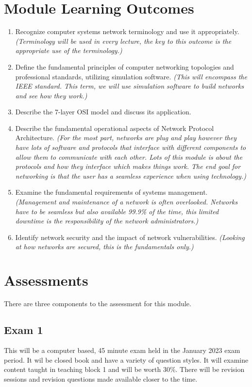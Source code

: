 \section*{Module Learning Outcomes}
\begin{enumerate}
    \item Recognize computer systems network terminology and use it appropriately. \textit{(Terminology will be used in every lecture, the key to this outcome is the appropriate use of the terminology.)}
    \item Define the fundamental principles of computer networking topologies and professional standards, utilizing simulation software. \textit{(This will encompass the IEEE standard. This term, we will use simulation software to build networks and see how they work.)}
    \item Describe the 7-layer OSI model and discuss its application.
    \item Describe the fundamental operational aspects of Network Protocol Architecture. \textit{(For the most part, networks are plug and play however they have lots of software and protocols that interface with different components to allow them to communicate with each other. Lots of this module is about the protocols and how they interface which makes things work. The end goal for networking is that the user has a seamless experience when using technology.)}
    \item Examine the fundamental requirements of systems management. \textit{(Management and maintenance of a network is often overlooked. Networks have to be seamless but also available 99.9\% of the time, this limited downtime is the responsibility of the network administrators.)}
    \item Identify network security and the impact of network vulnerabilities. \textit{(Looking at how networks are secured, this is the fundamentals only.)}
\end{enumerate}

\section*{Assessments}
There are three components to the assessment for this module.
\subsection*{Exam 1}
This will be a computer based, 45 minute exam held in the January 2023 exam period. It wil be closed book and have a variety of question styles. It will examine content taught in teaching block 1 and will be worth 30\%. There will be revision sessions and revision questions made available closer to the time.
